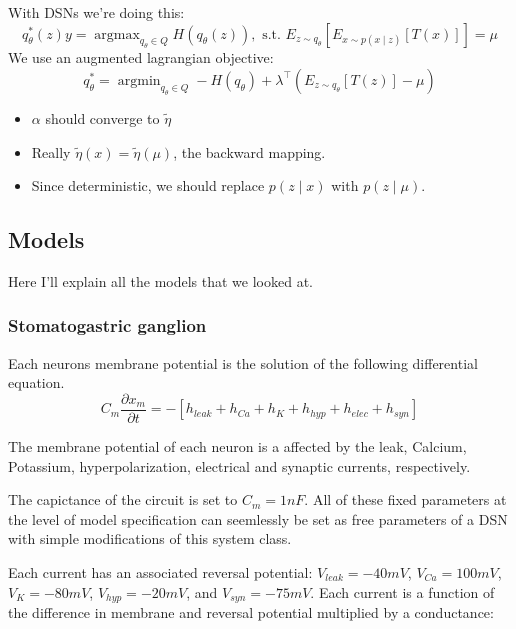 \documentclass[11pt]{article}
\DeclareMathOperator*{\argmin}{argmin}
\DeclareMathOperator*{\argmax}{argmax}
\begin{document}
With DSNs we're doing this:
\begin{equation}
q_\theta^*(z) y= \argmax_{q_\theta \in Q} H(q_\theta(z)),   \text{  s.t.  } E_{z \sim q_\theta}\left[ E_{x\sim p(x \mid z)}\left[T(x)\right] \right] = \mu
\end{equation}
We use an augmented lagrangian objective:
\begin{equation}
q_\theta^* = \argmin_{q_\theta \in Q} - H(q_\theta) + \lambda^\top \left(E_{z \sim q_\theta} \left[T(z) \right] - \mu \right)
\end{equation}
\begin{itemize}
\item $\alpha$ should converge to $\tilde{\eta}$
\item Really $\tilde{\eta}(x) = \tilde{\eta}(\mu)$, the backward mapping.
\item Since deterministic, we should replace $p(z \mid x)$ with $p(z \mid \mu)$.
\end{itemize}


\subsection{Models}
Here I'll explain all the models that we looked at.

\subsubsection{Stomatogastric ganglion}
Each neurons membrane potential is the solution of the following differential equation.
\begin{equation} C_m \frac{\partial x_m}{\partial t} = - \left[ h_{leak} + h_{Ca} + h_K + h_{hyp} + h_{elec} + h_{syn}\right] 
\end{equation} 

The membrane potential of each neuron is a affected by the leak, Calcium, Potassium, hyperpolarization,
electrical and synaptic currents, respectively.

The capictance of the circuit is set to $C_m = 1nF$.  All of these fixed parameters at the level of
model specification can seemlessly be set as free parameters of a DSN with simple
modifications of this system class.

Each current has an associated reversal potential: $V_{leak} = -40mV$, $V_{Ca} = 100mV$,
$V_K = -80mV$, $V_{hyp} = -20mV$, and $V_{syn} = -75mV$. Each current is a function of the
difference in membrane and reversal potential multiplied by a conductance:
\end{document}
